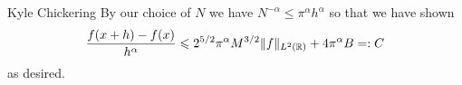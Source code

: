\begin{solution}{Kyle Chickering}
        By our choice of $N$ we have $N^{-\alpha} \leqslant \pi^\alpha h^\alpha$ so that we have shown
        \[ \frac{f(x+h)-f(x)}{h^\alpha} \leqslant 2^{5/2}\pi^\alpha M^{3/2}\lVert f\rVert_{L^2(\mathbb{R})} + 4\pi^\alpha B =: C \]
        as desired.
\end{solution}

